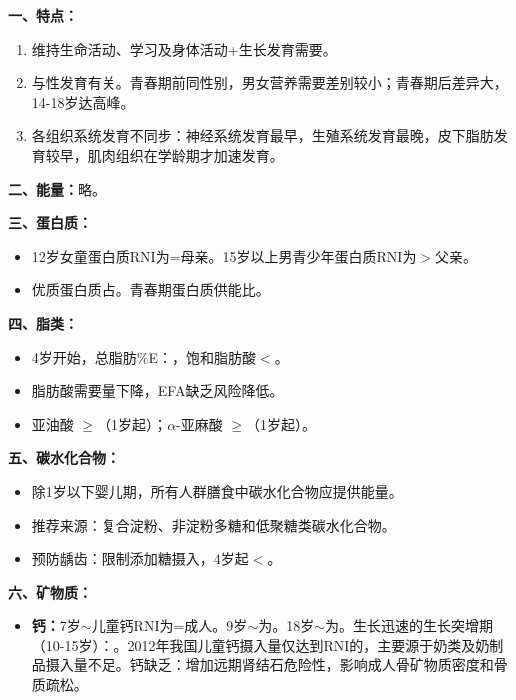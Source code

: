 \begin{keybox}
\textbf{一、特点：}
\begin{enumerate}[leftmargin=*]
    \item 维持生命活动、学习及身体活动+生长发育需要。
    \item 与性发育有关。青春期前同性别，男女营养需要差别较小；青春期后差异大，14-18岁达高峰。
    \item 各组织系统发育不同步：神经系统发育最早，生殖系统发育最晚，皮下脂肪发育较早，肌肉组织在学龄期才加速发育。
\end{enumerate}

\textbf{二、能量：}略。

\textbf{三、蛋白质：}
\begin{itemize}[leftmargin=*]
    \item 12岁女童蛋白质RNI为=母亲。15岁以上男青少年蛋白质RNI为$>$父亲。
    \item 优质蛋白质占。青春期蛋白质供能比。
\end{itemize}

\textbf{四、脂类：}
\begin{itemize}[leftmargin=*]
    \item 4岁开始，总脂肪\%E：，饱和脂肪酸$<$。
    \item 脂肪酸需要量下降，EFA缺乏风险降低。
    \item 亚油酸 $\geq$（1岁起）；$\alpha$-亚麻酸 $\geq$（1岁起）。
\end{itemize}

\textbf{五、碳水化合物：}
\begin{itemize}[leftmargin=*]
    \item 除1岁以下婴儿期，所有人群膳食中碳水化合物应提供能量。
    \item 推荐来源：复合淀粉、非淀粉多糖和低聚糖类碳水化合物。
    \item 预防龋齿：限制添加糖摄入，4岁起$<$。
\end{itemize}

\textbf{六、矿物质：}
\begin{itemize}[leftmargin=*]
    \item \textbf{钙：}7岁$\sim$儿童钙RNI为=成人。9岁$\sim$为。18岁$\sim$为。生长迅速的生长突增期（10-15岁）：。2012年我国儿童钙摄入量仅达到RNI的，主要源于奶类及奶制品摄入量不足。钙缺乏：增加远期肾结石危险性，影响成人骨矿物质密度和骨质疏松。


\end{itemize}
\end{keybox}
